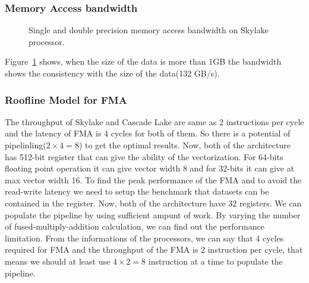 \documentclass[conference, 10ppt]{IEEEtran}
\begin{document}
\subsubsection{Memory Access bandwidth}
\begin{figure}[hbt!]
	\centering
	\caption{Single and double precision memory access bandwidth on Skylake processor.}
	\label{fig:stream-copy-bandwidth}
\end{figure}
Figure~\ref{fig:stream-copy-bandwidth} shows, when the size of the data is more than 1GB the bandwidth shows the consistency 
with the size of the data(132 GB/s).


\subsubsection{Roofline Model for FMA}
The throughput of Skylake and Cascade Lake are same as 2 instructions per cycle and the latency of FMA is 4 cycles for both of them. So there is a potential of pipelinling($2\times 4 = 8$) to get the optimal results. Now, both of the architecture 
has 512-bit register that can give the ability of the vectorization. For 64-bits floating point operation it can give vector 
width 8 and for 32-bits it can give at max vector width 16. To find the peak performance of the FMA and to avoid the 
read-write latency we need to setup the benchmark that datasets can be contained in the register. Now, both of the 
architecture have 32 registers. We can populate the pipeline by using sufficient ampunt of work. By varying the 
number of fused-multiply-addition calculation, we can find out the performance limitation. From the informations of the 
processors, we can say that 4 cycles required for FMA and the throughput of the FMA is 2 instruction per cycle, that means 
we should at least use $4\times 2=8$ instruction at a time to populate the pipeline.
\end{document}

